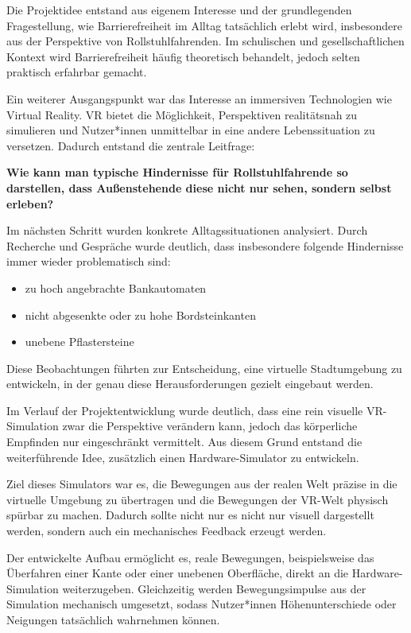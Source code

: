 
Die Projektidee entstand aus eigenem Interesse und der grundlegenden Fragestellung, wie Barrierefreiheit im Alltag tatsächlich erlebt wird, insbesondere aus der Perspektive von Rollstuhlfahrenden. Im schulischen und gesellschaftlichen Kontext wird Barrierefreiheit häufig theoretisch behandelt, jedoch selten praktisch erfahrbar gemacht.

Ein weiterer Ausgangspunkt war das Interesse an immersiven Technologien wie Virtual Reality. VR bietet die Möglichkeit, Perspektiven realitätsnah zu simulieren und Nutzer*innen unmittelbar in eine andere Lebenssituation zu versetzen. Dadurch entstand die zentrale Leitfrage:

\textbf{Wie kann man typische Hindernisse für Rollstuhlfahrende so darstellen, dass Außenstehende 
diese nicht nur sehen, sondern selbst erleben?}

Im nächsten Schritt wurden konkrete Alltagssituationen analysiert. Durch Recherche und Gespräche 
wurde deutlich, dass insbesondere folgende Hindernisse immer wieder problematisch sind:

\begin{itemize}
    \item zu hoch angebrachte Bankautomaten
    \item nicht abgesenkte oder zu hohe Bordsteinkanten
    \item unebene Pflastersteine
\end{itemize}

Diese Beobachtungen führten zur Entscheidung, eine virtuelle Stadtumgebung zu entwickeln, in der genau 
diese Herausforderungen gezielt eingebaut werden.

Im Verlauf der Projektentwicklung wurde deutlich, dass eine rein visuelle VR-Simulation zwar die 
Perspektive verändern kann, jedoch das körperliche Empfinden nur eingeschränkt vermittelt. Aus diesem Grund 
entstand die weiterführende Idee, zusätzlich einen Hardware-Simulator zu entwickeln.

Ziel dieses Simulators war es, die Bewegungen aus der realen Welt präzise in die virtuelle Umgebung zu 
übertragen und die Bewegungen der VR-Welt physisch spürbar zu machen. Dadurch sollte nicht nur es nicht nur
visuell dargestellt werden, sondern auch ein mechanisches Feedback erzeugt werden.

Der entwickelte Aufbau ermöglicht es, reale Bewegungen, beispielsweise das Überfahren einer Kante oder einer 
unebenen Oberfläche, direkt an die Hardware-Simulation weiterzugeben. Gleichzeitig werden Bewegungsimpulse aus der 
Simulation mechanisch umgesetzt, sodass Nutzer*innen Höhenunterschiede oder Neigungen tatsächlich wahrnehmen 
können.